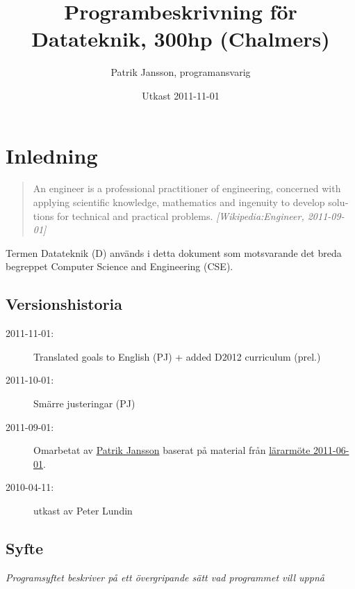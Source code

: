 \documentclass[twocolumn]{article}
\title{Programbeskrivning för Datateknik, 300hp (Chalmers)}
\author{Patrik Jansson, programansvarig}
\date{Utkast 2011-11-01}
\newcommand{\meta}[1]{{\small \emph{#1}}}
\begin{document}
\maketitle
\section{Inledning}

\begin{quote}
  \foreignlanguage{british}{An engineer is a professional practitioner
    of engineering, concerned with applying scientific knowledge,
    mathematics and ingenuity to develop solutions for technical and
    practical problems. \meta{[Wikipedia:Engineer, 2011-09-01]}}
\end{quote}

Termen Datateknik (D) används i detta dokument som motsvarande det
breda begreppet \foreignlanguage{british}{Computer Science and
  Engineering (CSE)}.

\subsection*{Versionshistoria}
{\small
\begin{description}
\item[2011-11-01:] Translated goals to English (PJ) + added D2012 curriculum (prel.)
\item[2011-10-01:] Smärre justeringar (PJ)
\item[2011-09-01:] Omarbetat av \href{http://www.chalmers.se/cse/EN/people/jansson-patrik}{Patrik Jansson} baserat på material från 
\href{http://wiki.portal.chalmers.se/cse/pmwiki.php/PAD/L%C3%A4rarm%C3%B6teVT2011}{lärarmöte 2011-06-01}.
\item[2010-04-11:] utkast av Peter Lundin
\end{description}
}

\subsection{Syfte} 
\meta{Programsyftet beskriver på ett övergripande sätt vad programmet vill
uppnå}
\end{document}
